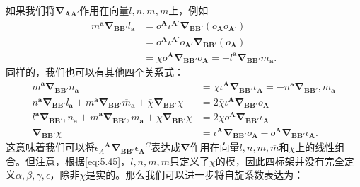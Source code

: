 如果我们将$\boldsymbol{\nabla }_{\boldsymbol{AA} '}$作用在向量$l,n,m,\overline{m}$上，例如
\begin{equation*}
	\begin{aligned}
		m^{\boldsymbol{a}}\mathbf{\nabla }_{\boldsymbol{BB} '} l_{\boldsymbol{a}} & =o^{\boldsymbol{A}} \iota ^{\boldsymbol{A} '}\mathbf{\nabla }_{\boldsymbol{BB} '} (o_{\boldsymbol{A}} o_{\boldsymbol{A} '} )\\
		& =o^{\boldsymbol{A}} \iota ^{\boldsymbol{A} '} o_{\boldsymbol{A} '}\mathbf{\nabla }_{\boldsymbol{BB} '} (o_{\boldsymbol{A}} )\\
		& =\overline{\chi } o^{\boldsymbol{A}}\mathbf{\nabla }_{\boldsymbol{BB} '} o_{\boldsymbol{A}} =-l^{\boldsymbol{a}}\mathbf{\nabla }_{\boldsymbol{BB} '} m_{\boldsymbol{a}} .
	\end{aligned}
\end{equation*}
同样的，我们也可以有其他四个关系式：
\begin{equation*}
	\begin{aligned}
		\overline{m}^{\boldsymbol{a}}\boldsymbol{\nabla }_{\boldsymbol{BB} '} n_{\boldsymbol{a}} & =\overline{\chi } \iota ^{\boldsymbol{A}}\boldsymbol{\nabla }_{\boldsymbol{BB} '} \iota _{\boldsymbol{A}} =-n^{\boldsymbol{a}}\boldsymbol{\nabla }_{\boldsymbol{BB} '} ,\overline{m}_{\boldsymbol{a}}\\
		n^{\boldsymbol{a}}\boldsymbol{\nabla }_{\boldsymbol{BB} '} l_{\boldsymbol{a}} +m^{\boldsymbol{a}}\boldsymbol{\nabla }_{\boldsymbol{BB} '}\overline{m}_{\boldsymbol{a}} +\overline{\chi }\boldsymbol{\nabla }_{\boldsymbol{BB} '} \chi  & =2\overline{\chi } \iota ^{\boldsymbol{A}}\boldsymbol{\nabla }_{\boldsymbol{BB} '} o_{\boldsymbol{A}}\\
		l^{\boldsymbol{a}}\boldsymbol{\nabla }_{\boldsymbol{BB} '} ,n_{\boldsymbol{a}} +\overline{m}^{\boldsymbol{a}}\boldsymbol{\nabla }_{\boldsymbol{BB} '} ,m_{\boldsymbol{a}} +\overline{\chi }\boldsymbol{\nabla }_{\boldsymbol{BB} '} \chi  & =2\overline{\chi } o^{\boldsymbol{A}}\boldsymbol{\nabla }_{\boldsymbol{BB} '} \iota _{\boldsymbol{A}}\\
		\boldsymbol{\nabla }_{\boldsymbol{BB} '} \chi  & =\iota ^{\boldsymbol{A}}\boldsymbol{\nabla }_{\boldsymbol{BB} '} o_{\boldsymbol{A}} -o^{\boldsymbol{A}}\boldsymbol{\nabla }_{\boldsymbol{BB} '} \iota _{\boldsymbol{A}} .
	\end{aligned}
\end{equation*}
这意味着我们可以将$\epsilon {_{A}}^{\boldsymbol{A}}\boldsymbol{\nabla }_{\boldsymbol{BB} '} \epsilon {_{\boldsymbol{A}}}^{C}$表达成$\boldsymbol{\nabla }$作用在向量$l,n,m,\overline{m}$和$\chi $上的线性组合。但注意，根据\ref{eq:5.45}，$l,n,m,\overline{m}$只定义了$\chi $的模，因此四标架并没有完全定义$\alpha ,\beta ,\gamma ,\epsilon $，除非$\chi $是实的。那么我们可以进一步将自旋系数表达为：
